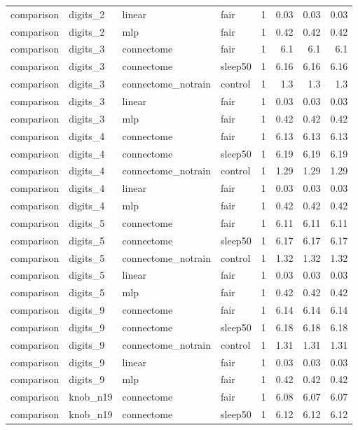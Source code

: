 \begin{table}[t]
\begin{tabular}{llllrrrr}
comparison & digits\_2 & linear & fair & 1 & 0.03 & 0.03 & 0.03 \\
comparison & digits\_2 & mlp & fair & 1 & 0.42 & 0.42 & 0.42 \\
comparison & digits\_3 & connectome & fair & 1 & 6.1 & 6.1 & 6.1 \\
comparison & digits\_3 & connectome & sleep50 & 1 & 6.16 & 6.16 & 6.16 \\
comparison & digits\_3 & connectome\_notrain & control & 1 & 1.3 & 1.3 & 1.3 \\
comparison & digits\_3 & linear & fair & 1 & 0.03 & 0.03 & 0.03 \\
comparison & digits\_3 & mlp & fair & 1 & 0.42 & 0.42 & 0.42 \\
comparison & digits\_4 & connectome & fair & 1 & 6.13 & 6.13 & 6.13 \\
comparison & digits\_4 & connectome & sleep50 & 1 & 6.19 & 6.19 & 6.19 \\
comparison & digits\_4 & connectome\_notrain & control & 1 & 1.29 & 1.29 & 1.29 \\
comparison & digits\_4 & linear & fair & 1 & 0.03 & 0.03 & 0.03 \\
comparison & digits\_4 & mlp & fair & 1 & 0.42 & 0.42 & 0.42 \\
comparison & digits\_5 & connectome & fair & 1 & 6.11 & 6.11 & 6.11 \\
comparison & digits\_5 & connectome & sleep50 & 1 & 6.17 & 6.17 & 6.17 \\
comparison & digits\_5 & connectome\_notrain & control & 1 & 1.32 & 1.32 & 1.32 \\
comparison & digits\_5 & linear & fair & 1 & 0.03 & 0.03 & 0.03 \\
comparison & digits\_5 & mlp & fair & 1 & 0.42 & 0.42 & 0.42 \\
comparison & digits\_9 & connectome & fair & 1 & 6.14 & 6.14 & 6.14 \\
comparison & digits\_9 & connectome & sleep50 & 1 & 6.18 & 6.18 & 6.18 \\
comparison & digits\_9 & connectome\_notrain & control & 1 & 1.31 & 1.31 & 1.31 \\
comparison & digits\_9 & linear & fair & 1 & 0.03 & 0.03 & 0.03 \\
comparison & digits\_9 & mlp & fair & 1 & 0.42 & 0.42 & 0.42 \\
comparison & knob\_n19 & connectome & fair & 1 & 6.08 & 6.07 & 6.07 \\
comparison & knob\_n19 & connectome & sleep50 & 1 & 6.12 & 6.12 & 6.12 \\

\end{tabular}
\end{table}
